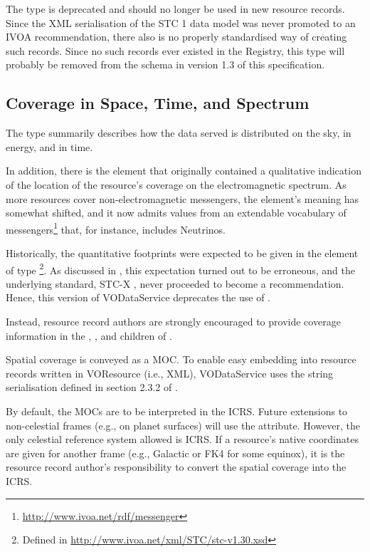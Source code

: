 \documentclass[11pt,a4paper]{ivoa}
\begin{document}
The  type is deprecated and should no longer be
used in new resource records.  Since the XML serialisation of the STC 1
data model was never promoted to an IVOA recommendation, there also is
no properly standardised way of creating such records.  Since no such
records ever existed in the Registry, this type will probably be removed
from the schema in version 1.3 of this specification.



\subsection{Coverage in Space, Time, and Spectrum}
\label{sect:cover}

The  type summarily describes how the data served is
distributed on the
sky, in energy, and in time.  

In addition, there is the  element that originally
contained a qualitative indication of the location of the resource's
coverage on the electromagnetic spectrum.  As more resources cover
non-electromagnetic messengers, the element's meaning has somewhat
shifted, and it now admits values from an extendable vocabulary of
messengers\footnote{\url{http://www.ivoa.net/rdf/messenger}} that, for
instance, includes Neutrinos.

Historically, the quantitative footprints were expected to be given in
the element of type \footnote{Defined in
\url{http://www.ivoa.net/xml/STC/stc-v1.30.xsd}}.  As discussed in
\citet{note:regstc}, this expectation turned out to be erroneous,
and the underlying standard, STC-X \citep{note:stcx}, never proceeded to become
a recommendation.  Hence, this version of VODataService deprecates the
use of .

Instead, resource record authors are strongly encouraged to provide
coverage information in the , , and
 children of .

Spatial coverage is conveyed as a MOC.  To enable easy embedding into
resource records written in VOResource (i.e., XML), 
VODataService uses the string serialisation defined in section 2.3.2 of 
\citet{2019ivoa.spec.1007F}.

By default, the MOCs are to be interpreted in the ICRS.  Future
extensions to non-celestial frames (e.g., on planet
surfaces) will use the  attribute.  
However, the only celestial reference system allowed is
ICRS.  If a resource's native coordinates are given for another frame (e.g.,
Galactic or FK4 for some equinox), it is the resource record author's
responsibility to convert the spatial coverage into the ICRS.
\end{document}
